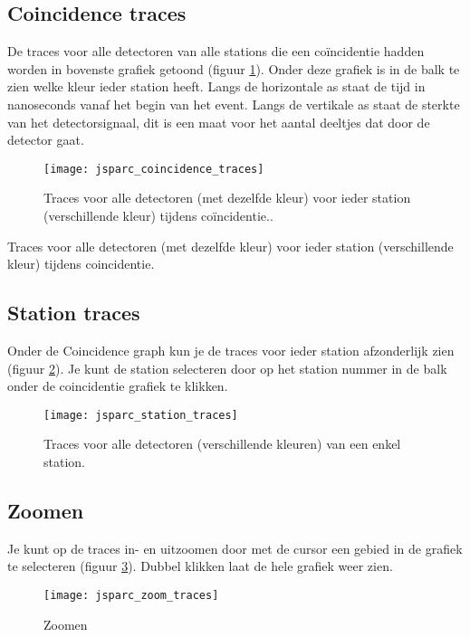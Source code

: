 \subsection{Coincidence traces}

De traces voor alle detectoren van alle stations die een co\"incidentie hadden
worden in bovenste grafiek getoond (figuur \ref{fig:stationtrace}). Onder deze grafiek is in de balk te zien 
welke kleur ieder station heeft.  Langs de horizontale as staat de tijd in 
nanoseconds vanaf het begin van het event. Langs de vertikale as staat de 
sterkte van het detectorsignaal, dit is een maat voor het aantal deeltjes dat 
door de detector gaat.

\begin{figure}[H]
    \centering
    \texttt{[image: jsparc\_coincidence\_traces]}
    \caption{Traces voor alle detectoren (met dezelfde kleur) voor ieder station 
                 (verschillende kleur) tijdens co\"incidentie..}
    \label{fig:stationtrace}
\end{figure}

   Traces voor alle detectoren (met dezelfde kleur) voor ieder station 
   (verschillende kleur) tijdens coincidentie.
   
\subsection{Station traces}

Onder de Coincidence graph kun je de traces voor ieder station afzonderlijk 
zien (figuur \ref{fig:detectortrace}). Je kunt de station selecteren door op het station nummer in de balk 
onder de coincidentie grafiek te klikken.

\begin{figure}[H]
    \centering
    \texttt{[image: jsparc\_station\_traces]}
    \caption{Traces voor alle detectoren (verschillende kleuren) van een enkel station.}
    \label{fig:detectortrace}
\end{figure}

\subsection{Zoomen}

Je kunt op de traces in- en uitzoomen door met de cursor een gebied in de 
grafiek te selecteren (figuur \ref{fig:zoomen}). Dubbel klikken laat de hele grafiek weer zien.

\begin{figure}[ht]
    \centering
    \texttt{[image: jsparc\_zoom\_traces]}
    \caption{Zoomen}
    \label{fig:zoomen}
\end{figure}

